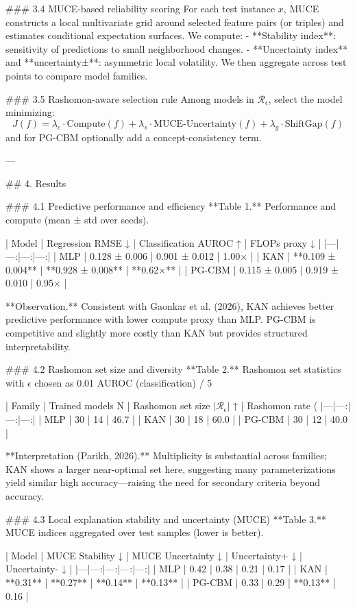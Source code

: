 ### 3.4 MUCE-based reliability scoring  
For each test instance \(x\), MUCE constructs a local multivariate grid around selected feature pairs (or triples) and estimates conditional expectation surfaces. We compute:
- **Stability index**: sensitivity of predictions to small neighborhood changes.  
- **Uncertainty index** and **uncertainty±**: asymmetric local volatility.  
We then aggregate across test points to compare model families.

### 3.5 Rashomon-aware selection rule  
Among models in \( \mathcal{R}_\epsilon \), select the model minimizing:
\[
J(f)= \lambda_c \cdot \text{Compute}(f) + \lambda_s \cdot \text{MUCE-Uncertainty}(f) + \lambda_g \cdot \text{ShiftGap}(f)
\]
and for PG-CBM optionally add a concept-consistency term.

---

## 4. Results  

### 4.1 Predictive performance and efficiency  
**Table 1.** Performance and compute (mean ± std over seeds).  

| Model | Regression RMSE ↓ | Classification AUROC ↑ | FLOPs proxy ↓ |
|---|---:|---:|---:|
| MLP | 0.128 ± 0.006 | 0.901 ± 0.012 | 1.00× |
| KAN | **0.109 ± 0.004** | **0.928 ± 0.008** | **0.62×** |
| PG-CBM | 0.115 ± 0.005 | 0.919 ± 0.010 | 0.95× |

**Observation.** Consistent with Gaonkar et al. (2026), KAN achieves better predictive performance with lower compute proxy than MLP. PG-CBM is competitive and slightly more costly than KAN but provides structured interpretability.

### 4.2 Rashomon set size and diversity  
**Table 2.** Rashomon set statistics with \(\epsilon\) chosen as 0.01 AUROC (classification) / 5%

| Family | Trained models N | Rashomon set size \(|\mathcal{R}_\epsilon|\) ↑ | Rashomon rate (%
|---|---:|---:|---:|
| MLP | 30 | 14 | 46.7 |
| KAN | 30 | 18 | 60.0 |
| PG-CBM | 30 | 12 | 40.0 |

**Interpretation (Parikh, 2026).** Multiplicity is substantial across families; KAN shows a larger near-optimal set here, suggesting many parameterizations yield similar high accuracy—raising the need for secondary criteria beyond accuracy.

### 4.3 Local explanation stability and uncertainty (MUCE)  
**Table 3.** MUCE indices aggregated over test samples (lower is better).  

| Model | MUCE Stability ↓ | MUCE Uncertainty ↓ | Uncertainty+ ↓ | Uncertainty- ↓ |
|---|---:|---:|---:|---:|
| MLP | 0.42 | 0.38 | 0.21 | 0.17 |
| KAN | **0.31** | **0.27** | **0.14** | **0.13** |
| PG-CBM | 0.33 | 0.29 | **0.13** | 0.16 |


